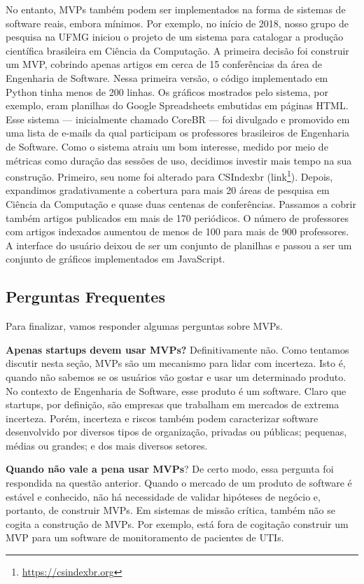 \documentclass[
  11pt,
  twoside]{book}
\DeclareRobustCommand{\href}[2]{#2\footnote{\url{#1}}}
\begin{document}
  No
entanto, MVPs também podem ser implementados na forma de sistemas de
software reais, embora mínimos. Por exemplo, no início de 2018, nosso
grupo de pesquisa na UFMG iniciou o projeto de um sistema para catalogar
a produção científica brasileira em Ciência da Computação. A primeira
decisão foi construir um MVP, cobrindo apenas artigos em cerca de 15
conferências da área de Engenharia de Software. Nessa primeira versão, o
código implementado em Python tinha menos de 200 linhas. Os gráficos
mostrados pelo sistema, por exemplo, eram planilhas do Google
Spreadsheets embutidas em páginas HTML. Esse sistema --- inicialmente
chamado CoreBR --- foi divulgado e promovido em uma lista de e-mails da
qual participam os professores brasileiros de Engenharia de Software.
Como o sistema atraiu um bom interesse, medido por meio de métricas como
duração das sessões de uso, decidimos investir mais tempo na sua
construção. Primeiro, seu nome foi alterado para CSIndexbr
(\href{https://csindexbr.org}{link}). Depois, expandimos gradativamente
a cobertura para mais 20 áreas de pesquisa em Ciência da Computação e
quase duas centenas de conferências. Passamos a cobrir também artigos
publicados em mais de 170 periódicos. O número de professores com
artigos indexados aumentou de menos de 100 para mais de 900 professores.
A interface do usuário deixou de ser um conjunto de planilhas e passou a
ser um conjunto de gráficos implementados em JavaScript.

\hypertarget{perguntas-frequentes-5}{%
\subsection{Perguntas Frequentes}\label{perguntas-frequentes-5}}

Para finalizar, vamos responder algumas perguntas sobre MVPs.

\textbf{Apenas startups devem usar MVPs?} Definitivamente não. Como
tentamos discutir nesta seção, MVPs são um mecanismo para lidar com
incerteza. Isto é, quando não sabemos se os usuários vão gostar e usar
um determinado produto. No contexto de Engenharia de Software, esse
produto é um software. Claro que startups, por definição, são empresas
que trabalham em mercados de extrema incerteza. Porém, incerteza e
riscos também podem caracterizar software desenvolvido por diversos
tipos de organização, privadas ou públicas; pequenas, médias ou grandes;
e dos mais diversos setores.

\textbf{Quando não vale a pena usar MVPs}? De certo modo, essa pergunta
foi respondida na questão anterior. Quando o mercado de um produto de
software é estável e conhecido, não há necessidade de validar hipóteses
de negócio e, portanto, de construir MVPs. Em sistemas de missão
crítica, também não se cogita a construção de MVPs. Por exemplo, está
fora de cogitação construir um MVP para um software de monitoramento de
pacientes de UTIs.
\end{document}
